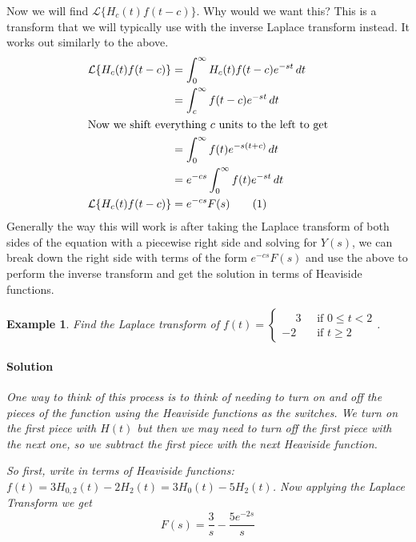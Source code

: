 \documentclass[letterpaper, 11pt, openany]{book}
\theoremstyle{mytheoremstyle}
\theoremstyle{myexamplestyle}
\newtheorem{example}{Example}[section]
\newenvironment{solution}{\paragraph{\sffamily \smaller \fontseries{b}\selectfont Solution}}{\hfill\faSquare}
\newcommand\numberthisline{\addtocounter{equation}{1}\tag{\theequation}}
\begin{document}
Now we will find \(\mathcal{L}\{H_{c}(t)f(t-c)\}\). Why would we want this? This is a transform that we will typically use with the inverse Laplace transform instead. It works out similarly to the above.
\begin{align*}
    \mathcal{L}\{H_{c}(t)f(t-c)\}   &= \int_{0}^{\infty} H_{c}(t)f(t-c) e^{-st} \, dt\\
                                    &= \int_{c}^{\infty} f(t-c) e^{-st} \, dt\\
                                    \intertext{Now we shift everything $c$ units to the left to get}
                                    &= \int_{0}^{\infty} f(t) e^{-s(t+c)} \, dt\\
                                    &= e^{-cs}\int_{0}^{\infty} f(t) e^{-st} \, dt\\
    \mathcal{L}\{H_{c}(t)f(t-c)\}   &= e^{-cs} F(s) \numberthisline \label{eq:Laplace-Heaviside-Inverse}
\end{align*}
Generally the way this will work is after taking the Laplace transform of both sides of the equation with a piecewise right side and solving for \(Y(s)\), we can break down the right side with terms of the form \(e^{-cs} F(s)\) and use the above to perform the inverse transform and get the solution in terms of Heaviside functions.

\begin{example}
    Find the Laplace transform of \(\displaystyle f(t) = \begin{cases}
        \phantom{-}3 \; &\text{ if } 0 \leq t < 2\\
        -2 \; &\text{ if } t \geq 2
    \end{cases}\).
    \begin{solution}
        One way to think of this process is to think of needing to turn on and off the pieces of the function using the Heaviside functions as the switches. We turn on the first piece with \(H(t)\) but then we may need to turn off the first piece with the next one, so we subtract the first piece with the next Heaviside function.
        
        So first, write in terms of Heaviside functions: \(f(t) = 3 H_{0,2}(t) -2 H_{2}(t) = 3H_{0}(t) - 5H_{2}(t)\). Now applying the Laplace Transform we get
        \[F(s) = \frac{3}{s} - \frac{5e^{-2s}}{s}\]
    \end{solution}
\end{example}
\end{document}
